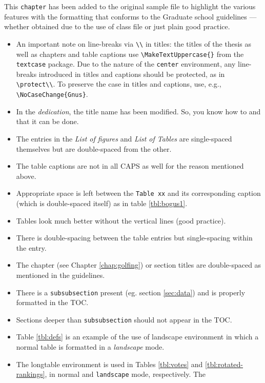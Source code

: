 \documentclass[draft,numrefs,sort&compress]{nddiss2e}
\begin{document}
This \verb+chapter+ has been added to the original sample file to highlight the
various features with the formatting that conforms to the Graduate school
guidelines --- whether obtained due to the use of \nddiss\/ class file or just
plain good practice.
\begin{itemize}
\item An important note on line-breaks via \verb+\\+ in titles: the
  titles of the thesis as well as chapters and table captions use
  \verb+\MakeTextUppercase{}+ from the \verb+textcase+ package.  Due
  to the nature of the \verb+center+ environment, any line-breaks
  introduced in titles and captions should be protected, as in
  \verb+\protect\\+.
  To preserve the case in titles and captions, use, e.g.,
  \verb+\NoCaseChange{Gnus}+.
\item In the \emph{dedication}, the title name has been modified. So, you know
how to and that it can be done.
\item The entries in the \emph{List of figures} and \emph{List of Tables} are
single-spaced themselves but are double-spaced from the other.
\item The table captions are not in all CAPS as well for the reason mentioned
above.
\item Appropriate space is left between the \verb+Table xx+ and its
corresponding caption (which is double-spaced itself) as in table \ref{tbl:bogus1}.
\item Tables look much better without the vertical lines (good practice).
\item There is double-spacing between the table entries but single-spacing
within the entry.
\item The chapter (see Chapter \ref{chap:golfing}) or section titles are
double-spaced as mentioned in the guidelines.
\item There is a \verb+subsubsection+ present (eg. section \ref{sec:data}) and
is properly formatted in the TOC.
\item Sections deeper than \verb+subsubsection+ should not appear in the TOC.
\item Table \ref{tbl:defs} is an example of the use of \textsf{landscape}
environment in which a normal table is formatted in a \emph{landscape} mode.
\item The \textsf{longtable} environment is used in Tables \ref{tbl:votes} and
\ref{tbl:rotated-rankings}, in normal and \verb+landscape+ mode, respectively. The

\end{itemize}
\end{document}
